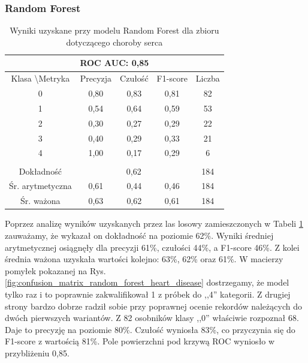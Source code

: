 \subsubsection{Random Forest}
\begin{table}[H]
 \centering
    \caption{Wyniki uzyskane przy modelu Random Forest dla zbioru dotyczącego choroby serca}
\begin{tabular}{|ccccc|}
\hline
\multicolumn{5}{|c|}{ROC AUC: 0,85}  \\ \hline
\multicolumn{1}{|c|}{Klasa \textbackslash Metryka} & \multicolumn{1}{c|}{Precyzja} & \multicolumn{1}{c|}{Czułość} & \multicolumn{1}{c|}{F1-score} & Liczba \\ \hline
\multicolumn{1}{|c|}{0}                            & \multicolumn{1}{c|}{0,80}     & \multicolumn{1}{c|}{0,83}    & \multicolumn{1}{c|}{0,81}     & 82    \\ \hline
\multicolumn{1}{|c|}{1}                            & \multicolumn{1}{c|}{0,54}     & \multicolumn{1}{c|}{0,64}    & \multicolumn{1}{c|}{0,59}     & 53    \\ \hline
\multicolumn{1}{|c|}{2}                            & \multicolumn{1}{c|}{0,30}     & \multicolumn{1}{c|}{0,27}    & \multicolumn{1}{c|}{0,29}     & 22    \\ \hline
\multicolumn{1}{|c|}{3}                            & \multicolumn{1}{c|}{0,40}     & \multicolumn{1}{c|}{0,29}    & \multicolumn{1}{c|}{0,33}     & 21    \\ \hline
\multicolumn{1}{|c|}{4}                            & \multicolumn{1}{c|}{1,00}     & \multicolumn{1}{c|}{0,17}    & \multicolumn{1}{c|}{0,29}     & 6     \\ \hline
\multicolumn{5}{|c|}{} \\ \hline
\multicolumn{1}{|c|}{Dokładność} & \multicolumn{3}{c|}{0,62}  & 184   \\ \hline
\multicolumn{1}{|c|}{Śr. arytmetyczna} & \multicolumn{1}{c|}{0,61} & \multicolumn{1}{c|}{0,44} & \multicolumn{1}{c|}{0,46} & 184 \\ \hline
\multicolumn{1}{|c|}{Śr. ważona} & \multicolumn{1}{c|}{0,63} & \multicolumn{1}{c|}{0,62} & \multicolumn{1}{c|}{0,61} & 184 \\ \hline
\end{tabular}
    \label{tab:heart_disease_random_forest_metrics}
\end{table}

Poprzez analizę wyników uzyskanych przez las losowy zamieszczonych w Tabeli \ref{tab:heart_disease_random_forest_metrics} zauważamy, że  wykazał on dokładność na poziomie 62\%. Wyniki średniej arytmetycznej osiągnęły dla precyzji 61\%, czułości 44\%, a F1-score 46\%. Z kolei średnia ważona uzyskała wartości kolejno: 63\%, 62\% oraz 61\%. W macierzy pomyłek pokazanej na Rys. \ref{fig:confusion_matrix_random_forest_heart_disease} dostrzegamy, że model tylko raz i to poprawnie zakwalifikował 1 z próbek do ,,4'' kategorii. Z drugiej strony bardzo dobrze radził sobie przy poprawnej ocenie rekordów należących do dwóch pierwszych wariantów. Z 82 osobników klasy ,,0'' właściwie rozpoznał 68. Daje to precyzję na poziomie 80\%. Czułość wyniosła 83\%, co przyczynia się do F1-score z wartością 81\%. Pole powierzchni pod krzywą ROC wyniosło w przybliżeniu 0,85.

